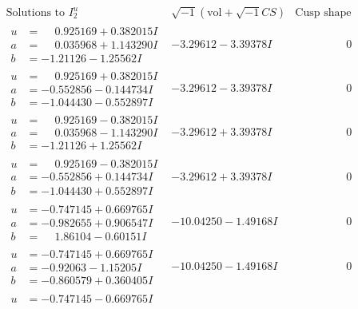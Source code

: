 \documentclass[1p]{elsarticle_modified}
\theoremstyle{definition}
\newcommand{\I}{\sqrt{-1}}
\begin{document}
$$\begin{array}{c|c|c}  
\text{Solutions to }I^u_{2}& \I (\text{vol} + \sqrt{-1}CS) & \text{Cusp shape}\\
 \hline 
\begin{aligned}
u &= \phantom{-}0.925169 + 0.382015 I \\
a &= \phantom{-}0.035968 + 1.143290 I \\
b &= -1.21126 - 1.25562 I\end{aligned}
 & -3.29612 - 3.39378 I & \phantom{-0.000000 } 0 \\ \hline\begin{aligned}
u &= \phantom{-}0.925169 + 0.382015 I \\
a &= -0.552856 - 0.144734 I \\
b &= -1.044430 - 0.552897 I\end{aligned}
 & -3.29612 - 3.39378 I & \phantom{-0.000000 } 0 \\ \hline\begin{aligned}
u &= \phantom{-}0.925169 - 0.382015 I \\
a &= \phantom{-}0.035968 - 1.143290 I \\
b &= -1.21126 + 1.25562 I\end{aligned}
 & -3.29612 + 3.39378 I & \phantom{-0.000000 } 0 \\ \hline\begin{aligned}
u &= \phantom{-}0.925169 - 0.382015 I \\
a &= -0.552856 + 0.144734 I \\
b &= -1.044430 + 0.552897 I\end{aligned}
 & -3.29612 + 3.39378 I & \phantom{-0.000000 } 0 \\ \hline\begin{aligned}
u &= -0.747145 + 0.669765 I \\
a &= -0.982655 + 0.906547 I \\
b &= \phantom{-}1.86104 - 0.60151 I\end{aligned}
 & -10.04250 - 1.49168 I & \phantom{-0.000000 } 0 \\ \hline\begin{aligned}
u &= -0.747145 + 0.669765 I \\
a &= -0.92063 - 1.15205 I \\
b &= -0.860579 + 0.360405 I\end{aligned}
 & -10.04250 - 1.49168 I & \phantom{-0.000000 } 0 \\ \hline\begin{aligned}
u &= -0.747145 - 0.669765 I \\

\end{aligned}
\end{array}$$
\end{document}
